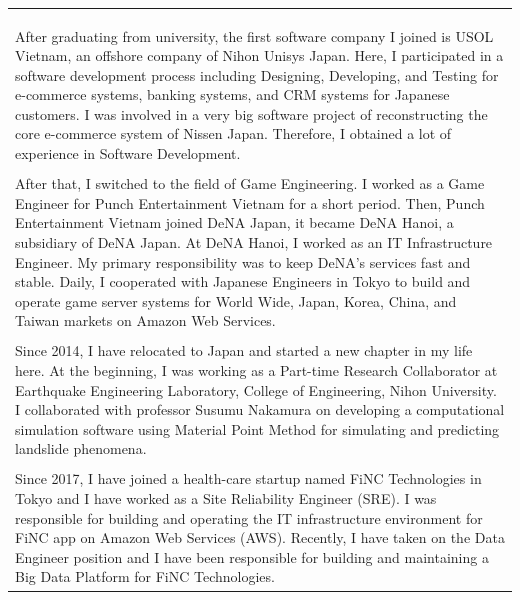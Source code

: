 \documentclass[a4paper,12pt]{article}
\begin{document}
\begin{tabular}{| L{16.268cm} |}
\hline
{}
\\[-0.42cm]
 \\
\hline
\\[-0.3cm]
\quad After graduating from university, the first software company I joined is USOL Vietnam, an offshore company of Nihon Unisys Japan. Here, I participated in a software development process including Designing, Developing, and Testing for e-commerce systems, banking systems, and CRM systems for Japanese customers. I was involved in a very big software project of reconstructing the core e-commerce system of Nissen Japan. Therefore, I obtained a lot of experience in Software Development. \\
\\[-0.3cm]
\quad After that, I switched to the field of Game Engineering. I worked as a Game Engineer for Punch Entertainment Vietnam for a short period. Then, Punch Entertainment Vietnam joined DeNA Japan, it became DeNA Hanoi, a subsidiary of DeNA Japan. At DeNA Hanoi, I worked as an IT Infrastructure Engineer. My primary responsibility was to keep DeNA's services fast and stable. Daily, I cooperated with Japanese Engineers in Tokyo to build and operate game server systems for World Wide, Japan, Korea, China, and Taiwan markets on Amazon Web Services. \\
\\[-0.3cm]
\quad Since 2014, I have relocated to Japan and started a new chapter in my life here. At the beginning, I was working as a Part-time Research Collaborator at Earthquake Engineering Laboratory, College of Engineering, Nihon University. I collaborated with professor Susumu Nakamura on developing a computational simulation software using Material Point Method for
simulating and predicting landslide phenomena.\\
\\[-0.3cm]
\quad Since 2017, I have joined a health-care startup named FiNC Technologies in Tokyo and I have worked as a Site Reliability Engineer (SRE). I was responsible for building and operating the IT infrastructure environment for FiNC app on Amazon Web Services (AWS). Recently, I have taken on the Data Engineer position and I have been responsible for building and maintaining a Big Data Platform for FiNC Technologies.\\[1.3cm]
\hline
\end{tabular}
\\[1.0cm]
\end{document}
